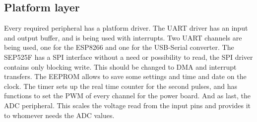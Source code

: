 \subsection{Platform layer}
Every required peripheral has a platform driver. The UART driver has an input and output buffer, and is being used with interrupts. Two UART channels are being used, one for the ESP8266 and one for the USB-Serial converter. The SEP525F has a SPI interface without a need or possibility to read, the SPI driver contains only blocking write. This should be changed to DMA and interrupt transfers. The EEPROM allows to save some settings and time and date on the clock. The timer sets up the real time counter for the second pulses, and has functions to set the PWM of every channel for the power board. And as last, the ADC peripheral. This scales the voltage read from the input pins and provides it to whomever needs the ADC values.
